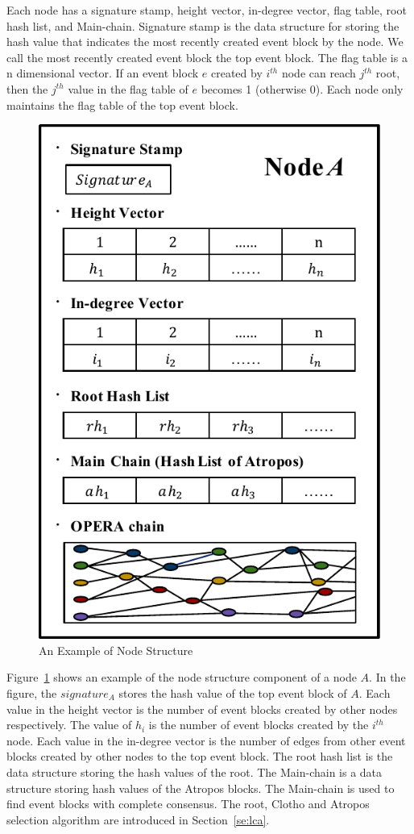 \documentclass[preprint,12pt]{elsarticle}
\begin{document}
Each node has a signature stamp, height vector, in-degree vector, flag table, root hash list, and Main-chain. Signature stamp is the data structure for storing the hash value that indicates the most recently created event block by the node. We call the most recently created event block the top event block. The flag table is a n dimensional vector. If an event block $e$ created by $i^{th}$ node can reach $j^{th}$ root, then the $j^{th}$ value in the flag table of $e$ becomes 1 (otherwise 0). Each node only maintains the flag table of the top event block.

 \begin{figure}[H] \centering  
   \includegraphics[width=.5\textwidth]{node_structure}
  \caption{An Example of Node Structure}
  \label{fig:node}
\end{figure}



Figure~\ref{fig:node} shows an example of the node structure component of a node $A$. In the figure, the $signature_A$ stores the hash value of the top event block of $A$. Each value in the height vector is the number of event blocks created by other nodes respectively. The value of $h_i$ is the number of event blocks created by the $i^{th}$ node. Each value in the in-degree vector is the number of edges from other event blocks created by other nodes to the top event block. The root hash list is the data structure storing the hash values of the root. The Main-chain is a data structure storing hash values of the Atropos blocks. The Main-chain is used to find event blocks with complete consensus. The root, Clotho and Atropos selection algorithm are introduced in Section~\ref{se:lca}. 
\end{document}
